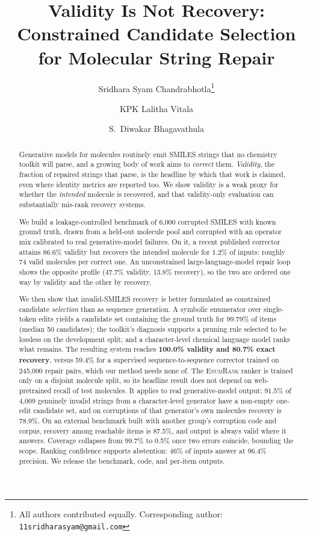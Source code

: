 \documentclass[11pt]{article}
\title{\bfseries Validity Is Not Recovery:\\Constrained Candidate Selection\\for Molecular String Repair}
\author[1]{Sridhara Syam Chandrabhotla\thanks{All authors contributed equally.
Corresponding author: \texttt{11sridharasyam@gmail.com}}}
\author[2]{KPK Lalitha Vitala}
\author[3]{S.\ Diwakar Bhagavathula}
\affil[1]{Independent Researcher, Bhimavaram, India}
\affil[2]{Department of Electronics and Communications, Vishnu Institute of
Technology, Bhimavaram, India. \texttt{lalitha.v@vishnu.edu.in}}
\affil[3]{Department of Chemistry, SRKR Engineering College, Bhimavaram, India.
\texttt{diwakar.b@srkrec.edu.in}}
\date{}
\newcommand{\ours}{\textsc{EnumRank}}
\begin{document}
\maketitle
\vspace{-2.5em}

\begin{abstract}
\noindent
Generative models for molecules routinely emit SMILES strings that no chemistry
toolkit will parse, and a growing body of work aims to \emph{correct} them.
\emph{Validity}, the fraction of repaired strings that parse, is the headline by
which that work is claimed, even where identity metrics are reported too. We show
validity is a weak proxy for whether the \emph{intended} molecule is recovered,
and that validity-only evaluation can substantially mis-rank recovery systems.

We build a leakage-controlled benchmark of 6{,}000 corrupted SMILES with known
ground truth, drawn from a held-out molecule pool and corrupted with an operator
mix calibrated to real generative-model failures. On
it, a recent published corrector attains 86.6\% validity but recovers the
intended molecule for 1.2\% of inputs: roughly 74 valid molecules per correct
one. An unconstrained large-language-model repair loop shows the opposite profile
(47.7\% validity, 13.8\% recovery), so the two are ordered one way by validity
and the other by recovery.

We then show that invalid-SMILES recovery is better formulated as constrained
candidate \emph{selection} than as sequence generation. A symbolic
enumerator over single-token edits yields a candidate set containing the ground
truth for 99.79\% of items (median 50 candidates); the toolkit's diagnosis
supports a pruning rule selected to be lossless on the development split; and a
character-level chemical language model ranks what remains.
The resulting system reaches \textbf{100.0\% validity and 80.7\% exact
recovery}, versus 59.4\% for a supervised sequence-to-sequence corrector trained
on 245{,}000 repair pairs, which our method needs none of.
The \ours{} ranker is trained only on a disjoint molecule split, so its headline
result does not depend on web-pretrained recall of test molecules. It applies to
real generative-model output: 91.5\% of 4{,}009 genuinely invalid strings from
a character-level generator have a non-empty one-edit candidate set, and on
corruptions of that generator's own molecules recovery is 78.9\%. On an external benchmark built with another group's corruption code and corpus,
recovery among reachable items is 87.5\%, and output is always valid where it
answers.
Coverage collapses from 99.7\% to 0.5\% once two errors coincide, bounding the
scope. Ranking confidence supports abstention: 46\% of inputs answer at 96.4\%
precision. We release the benchmark, code, and per-item outputs.
\end{abstract}
\end{document}
